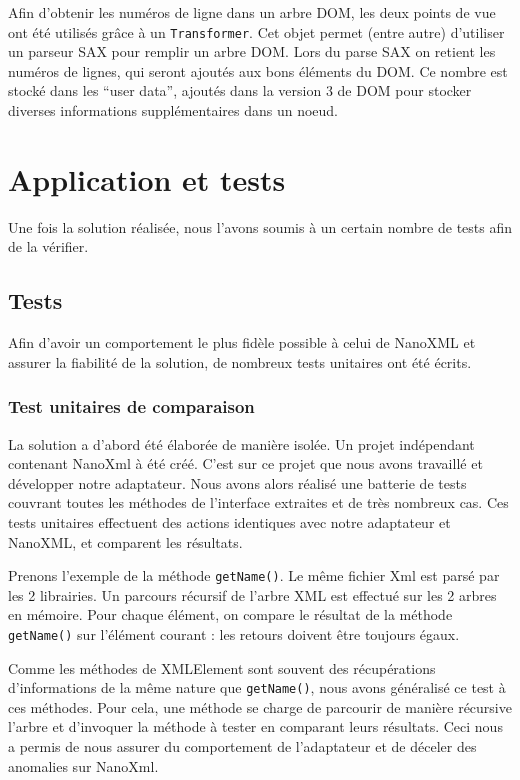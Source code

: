 Afin d'obtenir les numéros de ligne dans un arbre DOM, les deux points de vue ont été utilisés grâce à un \verb|Transformer|.
Cet objet permet (entre autre) d'utiliser un parseur SAX pour remplir un arbre DOM.
Lors du parse SAX on retient les numéros de lignes, qui seront ajoutés aux bons éléments du DOM.
Ce nombre est stocké dans les ``user data'', ajoutés dans la version 3  de DOM pour stocker diverses informations supplémentaires dans un noeud.

\section{Application et tests}
Une fois la solution réalisée, nous l'avons soumis à un certain nombre de tests afin de la vérifier.
\subsection{Tests}
Afin d'avoir un comportement le plus fidèle possible à celui de NanoXML et assurer la fiabilité de la solution, de nombreux tests unitaires ont été écrits.
\subsubsection{Test unitaires de comparaison}
La solution a d'abord été élaborée de manière isolée.
Un projet indépendant contenant NanoXml à été créé. 
C'est sur ce projet que nous avons travaillé et développer notre adaptateur.
Nous avons alors réalisé une batterie de tests couvrant toutes les méthodes de l'interface extraites et de très nombreux cas.
Ces tests unitaires effectuent des actions identiques avec notre adaptateur et NanoXML, et comparent les résultats.

Prenons l'exemple de la méthode \verb|getName()|. Le même fichier Xml est parsé par les 2 librairies.
Un parcours récursif de l'arbre XML est effectué sur les 2 arbres en mémoire.
Pour chaque élément, on compare le résultat de la méthode \verb|getName()| sur l'élément courant : les retours doivent être toujours égaux.

Comme les méthodes de XMLElement sont souvent des récupérations d'informations de la même nature que \verb|getName()|, nous avons généralisé ce test à ces méthodes.
Pour cela, une méthode se charge de parcourir de manière récursive l'arbre et d'invoquer la méthode à tester en comparant leurs résultats.
Ceci nous a permis de nous assurer du comportement de l'adaptateur et de déceler des anomalies sur NanoXml.

